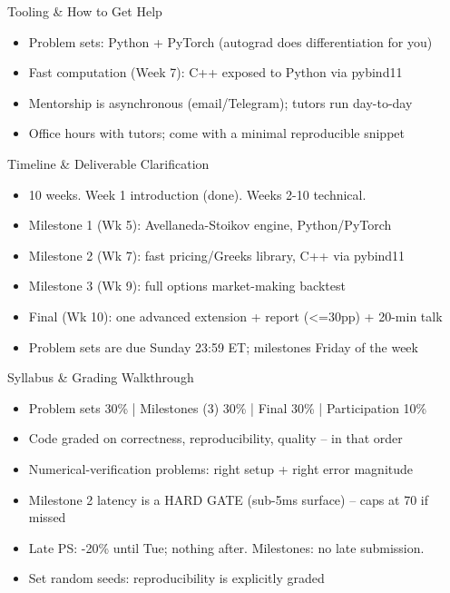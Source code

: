 \documentclass[aspectratio=169,10pt]{beamer}
\begin{document}
\begin{frame}{Tooling \& How to Get Help}
\begin{itemize}
  \item Problem sets: Python + PyTorch (autograd does differentiation for you)
  \item Fast computation (Week 7): C++ exposed to Python via pybind11
  \item Mentorship is asynchronous (email/Telegram); tutors run day-to-day
  \item Office hours with tutors; come with a minimal reproducible snippet
\end{itemize}
\end{frame}

\begin{frame}{Timeline \& Deliverable Clarification}
\begin{itemize}
  \item 10 weeks. Week 1 introduction (done). Weeks 2-10 technical.
  \item Milestone 1 (Wk 5): Avellaneda-Stoikov engine, Python/PyTorch
  \item Milestone 2 (Wk 7): fast pricing/Greeks library, C++ via pybind11
  \item Milestone 3 (Wk 9): full options market-making backtest
  \item Final (Wk 10): one advanced extension + report (\textless{}=30pp) + 20-min talk
  \item Problem sets are due Sunday 23:59 ET; milestones Friday of the week
\end{itemize}
\end{frame}

\begin{frame}{Syllabus \& Grading Walkthrough}
\begin{itemize}
  \item Problem sets 30\%  |  Milestones (3) 30\%  |  Final 30\%  |  Participation 10\%
  \item Code graded on correctness, reproducibility, quality -- in that order
  \item Numerical-verification problems: right setup + right error magnitude
  \item Milestone 2 latency is a HARD GATE (sub-5ms surface) -- caps at 70 if missed
  \item Late PS: -20\% until Tue; nothing after. Milestones: no late submission.
  \item Set random seeds: reproducibility is explicitly graded
\end{itemize}
\end{frame}
\end{document}
